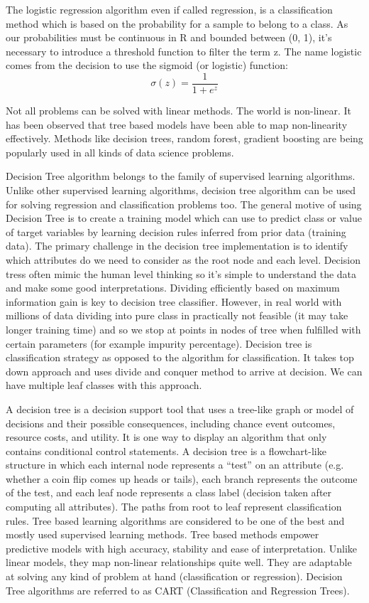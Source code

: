 \documentclass[12pt]{article}
\begin{document}
The logistic regression algorithm even if called regression, is a classification method which is based on the probability for
a sample to belong to a class. As our probabilities must be continuous in R and bounded between (0, 1), it's necessary to introduce a threshold function to filter the term z. The name logistic comes from the decision to use the sigmoid (or logistic) function:
$$\sigma(z) = \dfrac{1}{1+e^z}$$


Not all problems can be solved with linear methods. The world is non-linear. It has been observed that tree based models have been able to map non-linearity effectively. Methods like decision trees, random forest, gradient boosting are being popularly used in all kinds of data science problems.

Decision Tree algorithm belongs to the family of supervised learning algorithms. Unlike other supervised learning algorithms, decision tree algorithm can be used for solving regression and classification problems too. The general motive of using Decision Tree is to create a training model which can use to predict class or value of target variables by learning decision rules inferred from prior data (training data). The primary challenge in the decision tree implementation is to identify which attributes do we need to consider as the root node and each level. Decision tress often mimic the human level thinking so it’s simple to understand the data and make some good interpretations.
Dividing efficiently based on maximum information gain is key to decision tree classifier. However, in real world with millions of data dividing into pure class in practically not feasible (it may take longer training time) and so we stop at points in nodes of tree when fulfilled with certain parameters (for example impurity percentage). Decision tree is classification strategy as opposed to the algorithm for classification. It takes top down approach and uses divide and conquer method to arrive at decision. We can have multiple leaf classes with this approach.

A decision tree is a decision support tool that uses a tree-like graph or model of decisions and their possible consequences, including chance event outcomes, resource costs, and utility. It is one way to display an algorithm that only contains conditional control statements.
A decision tree is a flowchart-like structure in which each internal node represents a “test” on an attribute (e.g. whether a coin flip comes up heads or tails), each branch represents the outcome of the test, and each leaf node represents a class label (decision taken after computing all attributes). The paths from root to leaf represent classification rules.
Tree based learning algorithms are considered to be one of the best and mostly used supervised learning methods. Tree based methods empower predictive models with high accuracy, stability and ease of interpretation. Unlike linear models, they map non-linear relationships quite well. They are adaptable at solving any kind of problem at hand (classification or regression). Decision Tree algorithms are referred to as CART (Classification and Regression Trees).
\end{document}

